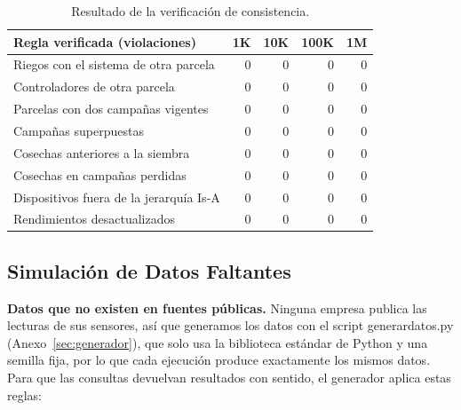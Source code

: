 \documentclass[11pt,letterpaper]{article}
\newcommand{\tbus}{\textunderscore\allowbreak}
\newcommand{\tb}[1]{{\ttfamily\let\_\tbus #1}}
\begin{document}
\begin{table}[H]
\centering\small
\begin{tabular}{lrrrr}
\toprule
Regla verificada (violaciones) & 1K & 10K & 100K & 1M \\
\midrule
Riegos con el sistema de otra parcela & 0 & 0 & 0 & 0 \\
Controladores de otra parcela & 0 & 0 & 0 & 0 \\
Parcelas con dos campañas vigentes & 0 & 0 & 0 & 0 \\
Campañas superpuestas & 0 & 0 & 0 & 0 \\
Cosechas anteriores a la siembra & 0 & 0 & 0 & 0 \\
Cosechas en campañas perdidas & 0 & 0 & 0 & 0 \\
Dispositivos fuera de la jerarquía Is-A & 0 & 0 & 0 & 0 \\
Rendimientos desactualizados & 0 & 0 & 0 & 0 \\
\bottomrule
\end{tabular}
\caption{Resultado de la verificación de consistencia.}\label{tab:verificacion}
\end{table}


\subsection{Simulación de Datos Faltantes}

\textbf{Datos que no existen en fuentes públicas.} Ninguna empresa publica las lecturas de sus sensores, así que generamos los datos con el script \tb{generar\_datos.py} (Anexo~\ref{sec:generador}), que solo usa la biblioteca estándar de Python y una semilla fija, por lo que cada ejecución produce exactamente los mismos datos. Para que las consultas devuelvan resultados con sentido, el generador aplica estas reglas:
\end{document}
